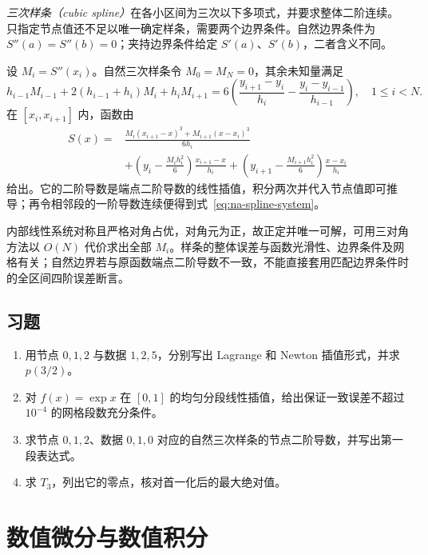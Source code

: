 \documentclass[UTF8,12pt,a4paper,fontset=fandol]{ctexbook}
\begin{document}
\emph{三次样条（cubic spline）}在各小区间为三次以下多项式，并要求整体二阶连续。只指定节点值还不足以唯一确定样条，需要两个边界条件。自然边界条件为 $S''(a)=S''(b)=0$；夹持边界条件给定 $S'(a)$、$S'(b)$，二者含义不同。

设 $M_i=S''(x_i)$。自然三次样条令 $M_0=M_N=0$，其余未知量满足
\begin{equation}
 h_{i-1}M_{i-1}+2(h_{i-1}+h_i)M_i+h_iM_{i+1}
 =6\left(\frac{y_{i+1}-y_i}{h_i}-\frac{y_i-y_{i-1}}{h_{i-1}}\right),
 \quad 1\le i<N.
 \label{eq:na-spline-system}
\end{equation}
在 $[x_i,x_{i+1}]$ 内，函数由
\begin{align*}
 S(x)={}&\frac{M_i(x_{i+1}-x)^3+M_{i+1}(x-x_i)^3}{6h_i}\\
 &+\left(y_i-\frac{M_ih_i^2}{6}\right)\frac{x_{i+1}-x}{h_i}
 +\left(y_{i+1}-\frac{M_{i+1}h_i^2}{6}\right)\frac{x-x_i}{h_i}
\end{align*}
给出。它的二阶导数是端点二阶导数的线性插值，积分两次并代入节点值即可推导；再令相邻段的一阶导数连续便得到式~\eqref{eq:na-spline-system}。

内部线性系统对称且严格对角占优，对角元为正，故正定并唯一可解，可用三对角方法以 $O(N)$ 代价求出全部 $M_i$。样条的整体误差与函数光滑性、边界条件及网格有关；自然边界若与原函数端点二阶导数不一致，不能直接套用匹配边界条件时的全区间四阶误差断言。

\section{习题}
\begin{enumerate}[label=\arabic*.]
\item\label{exr:na-interp-poly} 用节点 $0,1,2$ 与数据 $1,2,5$，分别写出 Lagrange 和 Newton 插值形式，并求 $p(3/2)$。
\item\label{exr:na-interp-error} 对 $f(x)=\exp x$ 在 $[0,1]$ 的均匀分段线性插值，给出保证一致误差不超过 $10^{-4}$ 的网格段数充分条件。
\item\label{exr:na-interp-spline} 求节点 $0,1,2$、数据 $0,1,0$ 对应的自然三次样条的节点二阶导数，并写出第一段表达式。
\item\label{exr:na-interp-cheb} 求 $T_3$，列出它的零点，核对首一化后的最大绝对值。
\end{enumerate}

\chapter{数值微分与数值积分}
\label{chap:na-quadrature}
\end{document}
